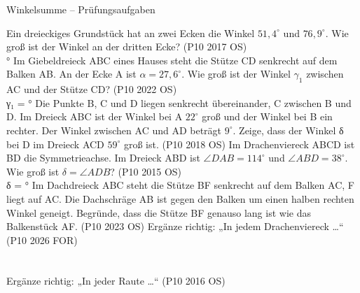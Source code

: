 \begin{aufgabe}{Winkelsumme – Prüfungsaufgaben}
\begin{teile}
\teil Ein dreieckiges Grundstück hat an zwei Ecken die Winkel $51{,}4^\circ$ und $76{,}9^\circ$. Wie groß ist der Winkel an der dritten Ecke? \hfill (P10 2017 OS) \\ \leerfeld °
\teil Im Giebeldreieck ABC eines Hauses steht die Stütze CD senkrecht auf dem Balken AB. An der Ecke A ist $\alpha = 27{,}6^\circ$. Wie groß ist der Winkel $\gamma_1$ zwischen AC und der Stütze CD? \hfill (P10 2022 OS) \\ γ₁ = \leerfeld °
\teil Die Punkte B, C und D liegen senkrecht übereinander, C zwischen B und D. Im Dreieck ABC ist der Winkel bei A $22^\circ$ groß und der Winkel bei B ein rechter. Der Winkel zwischen AC und AD beträgt $9^\circ$. Zeige, dass der Winkel δ bei D im Dreieck ACD $59^\circ$ groß ist. \hfill (P10 2018 OS)
\teil Im Drachenviereck ABCD ist BD die Symmetrieachse. Im Dreieck ABD ist $\angle DAB = 114^\circ$ und $\angle ABD = 38^\circ$. Wie groß ist $\delta = \angle ADB$? \hfill (P10 2015 OS) \\ δ = \leerfeld °
\teil Im Dachdreieck ABC steht die Stütze BF senkrecht auf dem Balken AC, F liegt auf AC. Die Dachschräge AB ist gegen den Balken um einen halben rechten Winkel geneigt. Begründe, dass die Stütze BF genauso lang ist wie das Balkenstück AF. \hfill (P10 2023 OS)
\teil Ergänze richtig: „In jedem Drachenviereck …“ \hfill (P10 2026 FOR) \\  \\  \\ 
\teil Ergänze richtig: „In jeder Raute …“ \hfill (P10 2016 OS) \\  \\  \\ 
\end{teile}
\end{aufgabe}

